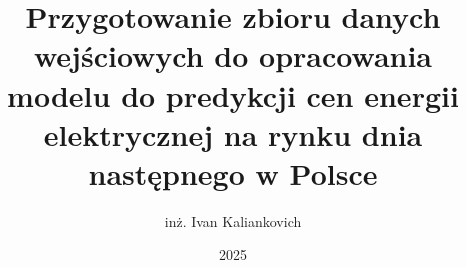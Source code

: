 \documentclass[thesis=mgr,faculty=gik]{EE-dyplom}
\title{Przygotowanie zbioru danych wejściowych do opracowania modelu do predykcji cen energii elektrycznej na rynku dnia następnego w Polsce}
\author{inż. Ivan Kaliankovich}
\date{2025}
\begin{document}
    \frontpages %

    
    \makeatletter
    \@openrightfalse
    \makeatother
    
    
    
    
    
    

    \bibliografia
    
    \acronymslist

    \listoffigures
    \listoftables
\end{document}

